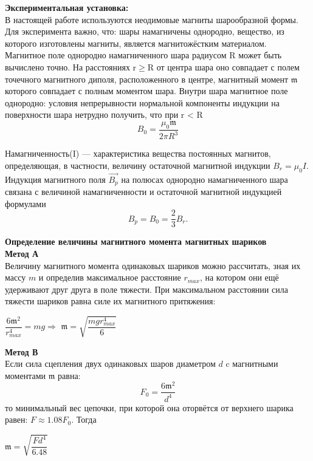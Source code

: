 \documentclass[a4paper, 12pt]{article}%
\begin{document}
	\textbf{Экспериментальная установка: }\\
	
	В настоящей работе используются неодимовые магниты шарообразной формы.
	Для эксперимента важно, что: шары намагничены однородно, вещество, из которого изготовлены магниты, является магнитожёстким материалом.\\
	
	Магнитное поле однородно намагниченного шара радиусом R может
	быть вычислено точно. На расстояниях r$\geq$R от центра шара оно совпадает с полем точечного магнитного диполя, расположенного в центре, магнитный момент $\mathfrak m$ которого совпадает с полным моментом шара.
	Внутри шара магнитное поле однородно: условия непрерывности нормальной компоненты индукции на поверхности
	шара нетрудно получить, что при r < R
	$$
	B_0 = \frac{\mu_0 \mathfrak m}{2\pi R^3}
	$$
	
	Намагниченность(I) — характеристика вещества постоянных магнитов, определяющая, в
	частности, величину остаточной магнитной индукции $B_r = \mu_0 I$. Индукция магнитного поля $\overrightarrow{B_p}$
	на полюсах однородно намагниченного шара связана с величиной намагниченности и остаточной магнитной индукцией формулами
	$$
	{B_p}=B_0=\dfrac{2}{3}{B_r}.
	$$
	
\textbf{Определение величины магнитного момента магнитных шариков}\\

	\textbf{Метод А}\\
	
	Величину магнитного момента одинаковых шариков
	можно рассчитать, зная их массу $m$ и определив максимальное расстояние $r_{max}$, на котором они ещё удерживают друг
	друга в поле тяжести. При максимальном расстоянии сила тяжести шариков равна силе их магнитного притяжения:
	\begin{center}
		$\dfrac{6\mathfrak m^2}{r_{max}^4}=mg\Rightarrow$ {$\mathfrak m = \sqrt{\dfrac{mgr_{max}^4}{6}}$}
	\end{center}

	\textbf{Метод В}\\
	
	Если сила сцепления двух одинаковых шаров диаметром $d$ c магнитными моментами $\mathfrak m$ равна:
	$$
	F_0 = \dfrac{6\mathfrak m^2}{d^4}
	$$
	то минимальный вес цепочки, при которой она оторвётся от верхнего шарика равен: $F \approx 1.08 F_0$. Тогда\\
	\begin{center}
		{$\mathfrak m = \sqrt{\dfrac{Fd^4}{6.48}}$}
	\end{center}
\end{document}
